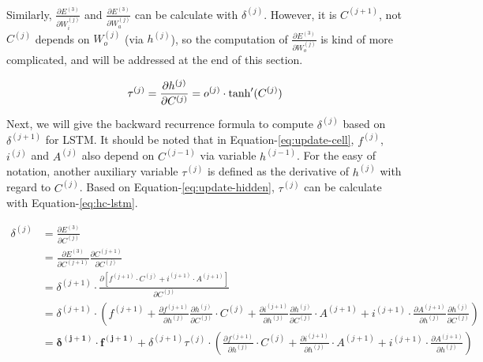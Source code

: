 \documentclass{article}
\begin{document}
Similarly, $\frac{\partial E^{(3)}}{\partial W^{(j)}_i}$ and $\frac{\partial E^{(3)}}{\partial W^{(j)}_a}$ can be calculate with $\delta^{(j)}$. 
However, it is $C^{(j+1)}$,  not $C^{(j)}$ depends on $W^{(j)}_o$ (via $h^{(j)}$),  so the computation of $\frac{\partial E^{(3)}}{\partial W^{(j)}_o}$ is 
kind of more complicated, and will be addressed at the end of this section.


 \begin{equation}\label{eq:hc-lstm}
    \tau^{(j)} = \frac{\partial h^{(j)}}{\partial C^{(j)}} = o^{(j)} \cdot \tanh'(C^{(j)})\\
\end{equation}


Next, we will give the backward recurrence formula to compute $\delta^{(j)}$ based on $\delta^{(j+1)}$ for LSTM. 
It should be noted that in Equation-\ref{eq:update-cell}, $f^{(j)}$, $i^{(j)}$ and $A^{(j)}$ also depend on $C^{(j-1)}$ via variable $h^{(j-1)}$. For the easy of notation, another auxiliary variable $\tau^{(j)}$ is defined as the derivative of $h^{(j)}$ with regard to $C^{(j)}$. Based on Equation-\ref{eq:update-hidden}, $\tau^{(j)}$ can be calculate with Equation-\ref{eq:hc-lstm}.

 \begin{equation}\label{eq:delta-lstm-recurrence}
 \begin{split}
    \delta^{(j)} &= \frac{\partial E^{(3)}}{\partial C^{(j)}} \\
                     &=  \frac{\partial E^{(3)}}{\partial C^{(j+1)}}  \frac{\partial C^{(j+1)}}{\partial C^{(j)}} \\
                     &= \delta^{(j+1)} \cdot  \frac{\partial [f^{(j+1)} \cdot C^{(j)} + i^{(j+1)}  \cdot A^{(j+1)}]}{\partial C^{(j)}} \\
                     &= \delta^{(j+1)} \cdot (f^{(j+1)}  + \frac{\partial f^{(j+1)}}{\partial h^{(j)}}\frac{\partial h^{(j)}}{\partial C^{(j)}} \cdot C^{(j)} +
                         \frac{\partial i^{(j+1)}}{\partial h^{(j)}}\frac{\partial h^{(j)}}{\partial C^{(j)}} \cdot A^{(j+1)} +
                         i^{(j+1)}  \cdot \frac{\partial A^{(j+1)}}{\partial h^{(j)}}\frac{\partial h^{(j)}}{\partial C^{(j)}})\\
                    &= \pmb{\delta^{(j+1)} \cdot f^{(j+1)} } + 
                           \delta^{(j+1)} \tau^{(j)} \cdot (\frac{\partial f^{(j+1)}}{\partial h^{(j)}} \cdot C^{(j)} +
                                                                         \frac{\partial i^{(j+1)}}{\partial h^{(j)}} \cdot A^{(j+1)} +
                                                                        i^{(j+1)} \cdot \frac{\partial A^{(j+1)}}{\partial h^{(j)}})\\
 \end{split}                       
\end{equation}
\end{document}
